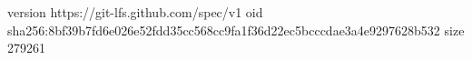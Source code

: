 version https://git-lfs.github.com/spec/v1
oid sha256:8bf39b7fd6e026e52fdd35cc568cc9fa1f36d22ec5bcccdae3a4e9297628b532
size 279261
